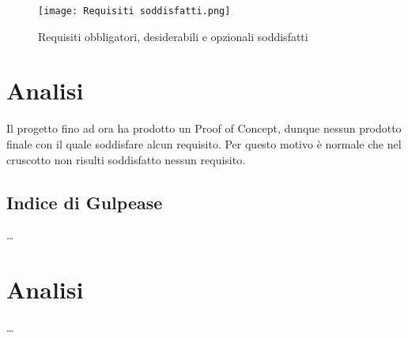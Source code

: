 \begin{figure}[h] 
    \centering
    \texttt{[image: Requisiti soddisfatti.png]}
    \caption{Requisiti obbligatori, desiderabili e opzionali soddisfatti} 
    \label{fig: Requisiti soddisfatti}
\end{figure}

\section*{Analisi}
Il progetto fino ad ora ha prodotto un Proof of Concept, dunque nessun prodotto finale con il quale soddisfare alcun requisito.
Per questo motivo è normale che nel cruscotto non risulti soddisfatto nessun requisito.



\subsection{Indice di Gulpease}

\dots

\section*{Analisi}

\dots